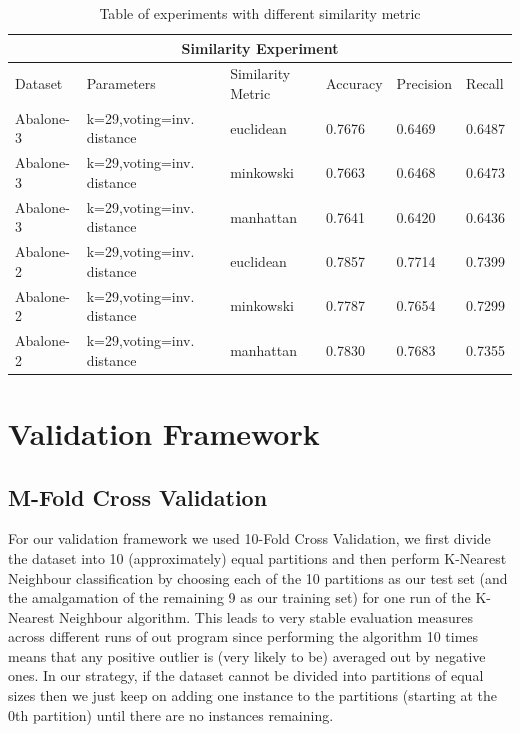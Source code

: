 \begin{table}[h]
\centering
\begin{tabular}{|p{2cm}|p{3cm}||p{2cm}|p{1.5cm}|p{1.5cm}|p{1.5cm}|}
 \hline
 \multicolumn{6}{|c|}{Similarity Experiment} \\
 \hline
 Dataset & Parameters & Similarity Metric & Accuracy & Precision & Recall\\
 \hline
 Abalone-3 & k=29,voting=inv. distance &   euclidean & 0.7676  & 0.6469 & 0.6487\\
 \hline
 Abalone-3 & k=29,voting=inv. distance &   minkowski & 0.7663 & 0.6468 & 0.6473\\
 \hline
 Abalone-3 & k=29,voting=inv. distance &   manhattan & 0.7641 & 0.6420 & 0.6436\\ 
 \hline
 Abalone-2 & k=29,voting=inv. distance &   euclidean & 0.7857  & 0.7714 & 0.7399\\
 \hline
 Abalone-2 & k=29,voting=inv. distance &   minkowski & 0.7787 & 0.7654 & 0.7299\\
 \hline
 Abalone-2 & k=29,voting=inv. distance &   manhattan & 0.7830  & 0.7683 & 0.7355\\ 
 \hline

\end{tabular}
\caption{Table of experiments with different similarity metric}
\end{table}
\label{Figure 1}




\section{Validation Framework}

\subsection{M-Fold Cross Validation}

For our validation framework we used 10-Fold Cross Validation, we first divide the dataset into 10 (approximately) equal partitions and then perform K-Nearest Neighbour classification by choosing each of the 10 partitions as our test set (and the amalgamation of the remaining 9 as our training set) for one run of the K-Nearest Neighbour algorithm. This leads to very stable evaluation measures across different runs of out program since performing the algorithm 10 times means that any positive outlier is (very likely to be) averaged out by negative ones. In our strategy, if the dataset cannot be divided into partitions of equal sizes then we just keep on adding one instance to the partitions (starting at the 0th partition) until there are no instances remaining.\\


